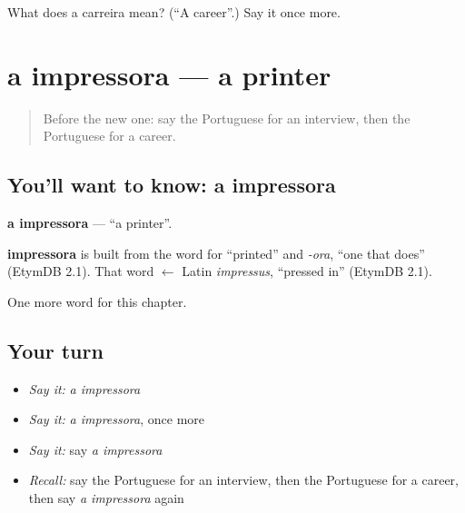 \begin{tcolorbox}[breakable,colback=teal!4,colframe=teal!35!black,title={Before you move on}]
What does a carreira mean? (\textquotedblleft{}A career\textquotedblright{}.) Say it once more.
\end{tcolorbox}
\section[a impressora]{a impressora — a printer}

\label{lesson:PT-C200-impressora}



\begin{quote}
Before the new one: say the Portuguese for an interview, then the Portuguese for a career.
\end{quote}

\subsection*{You'll want to know: a impressora}
\textbf{a impressora} — \textquotedblleft{}a printer\textquotedblright{}.

\begin{cousinweb}
\textbf{impressora} is built from the word for \textquotedblleft{}printed\textquotedblright{} and \emph{-ora}, \textquotedblleft{}one that does\textquotedblright{} (EtymDB 2.1). That word $\leftarrow$ Latin \emph{impressus}, \textquotedblleft{}pressed in\textquotedblright{} (EtymDB 2.1).
\end{cousinweb}

\begin{grammarlens}[title={What you've built}]
One more word for this chapter.
\end{grammarlens}

\subsection*{Your turn}
\begin{itemize}
\raggedright
  \item \emph{Say it:} \emph{a impressora}
  \item \emph{Say it:} \emph{a impressora}, once more
  \item \emph{Say it:} say \emph{a impressora}
  \item \emph{Recall:} say the Portuguese for an interview, then the Portuguese for a career, then say \emph{a impressora} again
\end{itemize}


